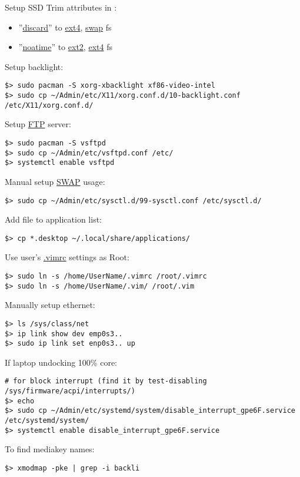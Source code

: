 \documentclass[a4paper, 12pt]{article}
\begin{document}
Setup SSD Trim attributes in :
\begin{itemize}
\item ''\url{discard}'' to \url{ext4}, \url{swap} fs
\item ''\url{noatime}'' to \url{ext2}, \url{ext4} fs
\end{itemize}

Setup backlight:
\begin{lstlisting}
$> sudo pacman -S xorg-xbacklight xf86-video-intel
$> sudo cp ~/Admin/etc/X11/xorg.conf.d/10-backlight.conf /etc/X11/xorg.conf.d/
\end{lstlisting}

Setup \url{FTP} server:
\begin{lstlisting}
$> sudo pacman -S vsftpd
$> sudo cp ~/Admin/etc/vsftpd.conf /etc/
$> systemctl enable vsftpd
\end{lstlisting}

Manual setup \url{SWAP} usage:
\begin{lstlisting}
$> sudo cp ~/Admin/etc/sysctl.d/99-sysctl.conf /etc/sysctl.d/
\end{lstlisting}

Add  file to application list:
\begin{lstlisting}
$> cp *.desktop ~/.local/share/applications/
\end{lstlisting}

Use user's \url{.vimrc} settings as Root:
\begin{lstlisting}
$> sudo ln -s /home/UserName/.vimrc /root/.vimrc
$> sudo ln -s /home/UserName/.vim/ /root/.vim
\end{lstlisting}

Manually setup ethernet:
\begin{lstlisting}
$> ls /sys/class/net
$> ip link show dev emp0s3..
$> sudo ip link set enp0s3.. up
\end{lstlisting}

If laptop undocking 100\% core:
\begin{lstlisting}
# for block interrupt (find it by test-disabling /sys/firmware/acpi/interrupts/)
$> echo
$> sudo cp ~/Admin/etc/systemd/system/disable_interrupt_gpe6F.service /etc/systemd/system/
$> systemctl enable disable_interrupt_gpe6F.service
\end{lstlisting}

To find mediakey names:
\begin{lstlisting}
$> xmodmap -pke | grep -i backli
\end{lstlisting}
\end{document}
